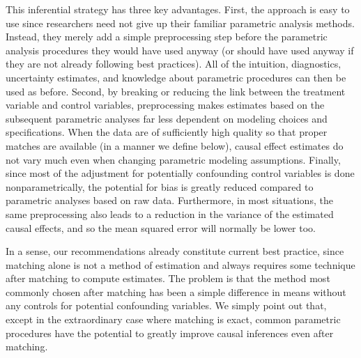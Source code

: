\documentclass[11pt,titlepage]{article}
\begin{document}
This inferential strategy has three key advantages.  First, the
approach is easy to use since researchers need not give up their
familiar parametric analysis methods.  Instead, they merely add a
simple preprocessing step before the parametric analysis procedures
they would have used anyway (or should have used anyway if they are
not already following best practices).  All of the intuition,
diagnostics, uncertainty estimates, and knowledge about parametric
procedures can then be used as before.  Second, by breaking or
reducing the link between the treatment variable and control
variables, preprocessing makes estimates based on the subsequent
parametric analyses far less dependent on modeling choices and
specifications.  When the data are of sufficiently high quality so
that proper matches are available (in a manner we define below),
causal effect estimates do not vary much even when changing parametric
modeling assumptions.  Finally, since most of the adjustment for
potentially confounding control variables is done nonparametrically,
the potential for bias is greatly reduced compared to parametric
analyses based on raw data.  Furthermore, in most situations, the same
preprocessing also leads to a reduction in the variance of the
estimated causal effects, and so the mean squared error will normally
be lower too.

In a sense, our recommendations already constitute current best
practice, since matching alone is not a method of estimation and
always requires some technique after matching to compute estimates.
The problem is that the method most commonly chosen after matching has
been a simple difference in means without any controls for potential
confounding variables.  We simply point out that, except in the
extraordinary case where matching is exact, common parametric
procedures have the potential to greatly improve causal inferences
even after matching.
\end{document}
